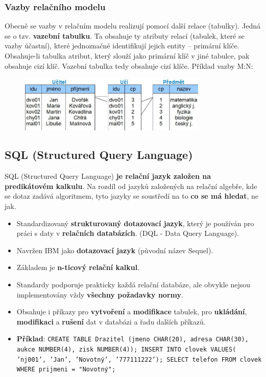 \subsubsection{Vazby relačního modelu}
Obecně se vazby v relačním modelu realizují pomocí další relace (tabulky). Jedná se o tzv. \textbf{vazební tabulku}. Ta obsahuje ty atributy relací (tabulek, které se vazby účastní), které jednoznačné identifikují jejich entity -- primární klíče. Obsahuje-li tabulka atribut, který slouží jako primární klíč v jiné tabulce, pak obsahuje cizí klíč. Vazební tabulka tedy obsahuje cizí klíče. Příklad vazby M:N:

\begin{figure}[H]
	\centering
	\includegraphics[width=0.8\textwidth]{assets/mn.png}
\end{figure}

\subsection{SQL (Structured Query Language)}
SQL (Structured Query Language) \textbf{je relační jazyk založen na predikátovém kalkulu}. Na rozdíl od jazyků založených na relační algebře, kde se dotaz zadává algoritmem, tyto jazyky se soustředí na to \textbf{co se má hledat}, ne jak.

\begin{itemize}
	\item Standardizovaný\textbf{ strukturovaný dotazovací jazyk}, který je používán pro práci s daty v \textbf{relačních databázích}. (DQL - Data Query Language).
	\item Navržen IBM jako \textbf{dotazovací jazyk} (původní název Sequel).
	\item Základem je \textbf{n-ticový relační kalkul}.
	\item Standardy podporuje prakticky každá relační databáze, ale obvykle nejsou implementovány vždy\textbf{ všechny požadavky normy}.
	\item Obsahuje i příkazy pro \textbf{vytvoření} a \textbf{modifikace} tabulek, pro \textbf{ukládání}, \textbf{modifikaci} a \textbf{rušení} dat v databázi a řadu dalších příkazů.
	\item \textbf{Příklad}: \texttt{CREATE TABLE Drazitel (jmeno CHAR(20), adresa CHAR(30), aukce NUMBER(4), zisk NUMBER(4)); INSERT INTO  clovek VALUES( 'nj001', 'Jan', 'Novotný', '777111222'); SELECT telefon FROM clovek WHERE prijmeni = "Novotný";}
\end{itemize}

